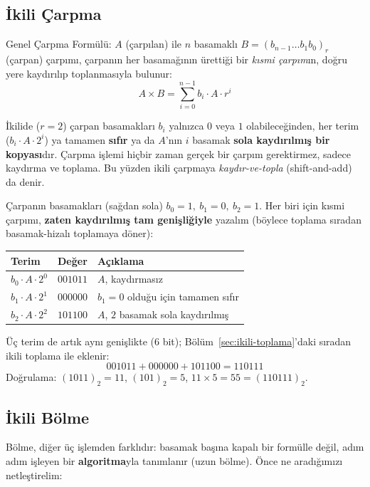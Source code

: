 \subsection{İkili Çarpma}
\label{sec:ikili-carpma}

\begin{tanim}{Genel Çarpma Formülü:}
$A$ (çarpılan) ile $n$ basamaklı $B=(b_{n-1}\ldots b_1b_0)_r$ (çarpan) çarpımı, çarpanın her
basamağının ürettiği bir \emph{kısmi çarpım}ın, doğru yere kaydırılıp toplanmasıyla bulunur:
\[
A\times B = \sum_{i=0}^{n-1} b_i \cdot A \cdot r^i
\]
\end{tanim}

İkilide ($r{=}2$) çarpan basamakları $b_i$ yalnızca $0$ veya $1$ olabileceğinden, her terim
($b_i\cdot A\cdot 2^i$) ya tamamen \textbf{sıfır} ya da $A$'nın $i$ basamak
\textbf{sola kaydırılmış bir kopyası}dır. Çarpma işlemi hiçbir zaman gerçek bir çarpım
gerektirmez, sadece kaydırma ve toplama. Bu yüzden ikili çarpmaya \emph{kaydır-ve-topla}
(shift-and-add) da denir.

\begin{ornek}[$(1011)_2\times(101)_2$]
Çarpanın basamakları (sağdan sola) $b_0{=}1,\ b_1{=}0,\ b_2{=}1$. Her biri için kısmi çarpımı,
\textbf{zaten kaydırılmış tam genişliğiyle} yazalım (böylece toplama sıradan basamak-hizalı
toplamaya döner):
\begin{center}
\begin{tabular}{lll}
\toprule
Terim & Değer & Açıklama \\
\midrule
$b_0\cdot A\cdot 2^0$ & $001011$ & $A$, kaydırmasız \\
$b_1\cdot A\cdot 2^1$ & $000000$ & $b_1{=}0$ olduğu için tamamen sıfır \\
$b_2\cdot A\cdot 2^2$ & $101100$ & $A$, $2$ basamak sola kaydırılmış \\
\bottomrule
\end{tabular}
\end{center}
Üç terim de artık aynı genişlikte ($6$ bit); Bölüm~\ref{sec:ikili-toplama}'daki sıradan
ikili toplama ile eklenir:
\[
001011 + 000000 + 101100 = 110111
\]
Doğrulama: $(1011)_2=11$, $(101)_2=5$, $11\times5=55=(110111)_2$. \checkmark
\end{ornek}

\subsection{İkili Bölme}
\label{sec:ikili-bolme}

Bölme, diğer üç işlemden farklıdır: basamak başına kapalı bir formülle değil, adım adım
işleyen bir \textbf{algoritma}yla tanımlanır (uzun bölme). Önce ne aradığımızı netleştirelim:

